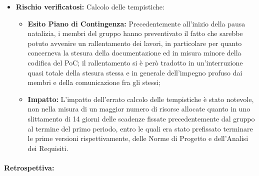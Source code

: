 \begin{itemize}
\item \textbf{Rischio verificatosi:} Calcolo delle tempistiche:
\begin{itemize}
    \item \textbf{Esito Piano di Contingenza:} Precedentemente all'inizio della pausa natalizia, i membri del gruppo hanno preventivato il fatto che sarebbe potuto avvenire un rallentamento dei lavori, in particolare per quanto concerneva la stesura della documentazione ed in misura minore della codifica del PoC; il rallentamento si è però tradotto in un'interruzione quasi totale della stesura stessa e in generale dell'impegno profuso dai membri e della comunicazione fra gli stessi;
    \item \textbf{Impatto:} L'impatto dell'errato calcolo delle tempistiche è stato notevole, non nella misura di un maggior numero di risorse allocate quanto in uno slittamento di 14 giorni delle scadenze fissate precedentemente dal gruppo al termine del primo periodo, entro le quali era stato prefissato terminare le prime versioni rispettivamente, delle Norme di Progetto e dell'Analisi dei Requisiti.
\end{itemize}
\end{itemize}

\paragraph{}
\textbf{Retrospettiva:} 

